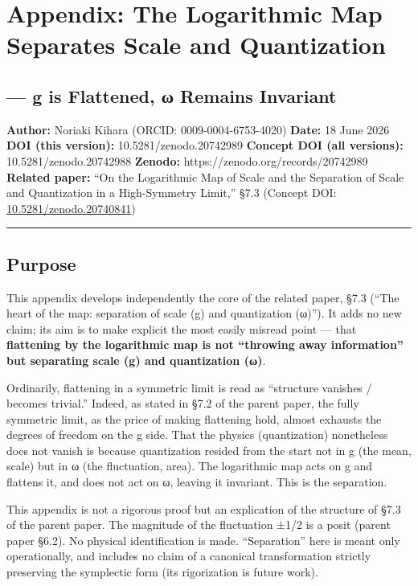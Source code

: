 \documentclass[11pt]{ltjsarticle}
\newcounter{none}
\begin{document}
\section{Appendix: The Logarithmic Map Separates Scale and
Quantization}\label{appendix-the-logarithmic-map-separates-scale-and-quantization}

\subsection{--- g is Flattened, ω Remains
Invariant}\label{g-is-flattened-ux3c9-remains-invariant}

\textbf{Author:} Noriaki Kihara (ORCID: 0009-0004-6753-4020)
\textbf{Date:} 18 June 2026 \textbf{DOI (this version):}
10.5281/zenodo.20742989 \textbf{Concept DOI (all versions):}
10.5281/zenodo.20742988 \textbf{Zenodo:}
https://zenodo.org/records/20742989 \textbf{Related paper:} ``On the
Logarithmic Map of Scale and the Separation of Scale and Quantization in
a High-Symmetry Limit,'' §7.3 (Concept DOI:
\href{https://doi.org/10.5281/zenodo.20740841}{10.5281/zenodo.20740841})

\begin{center}\rule{0.5\linewidth}{0.5pt}\end{center}

\subsection{Purpose}\label{purpose}

This appendix develops independently the core of the related paper, §7.3
(``The heart of the map: separation of scale (g) and quantization
(ω)''). It adds no new claim; its aim is to make explicit the most
easily misread point --- that \textbf{flattening by the logarithmic map
is not ``throwing away information'' but separating scale (g) and
quantization (ω)}.

Ordinarily, flattening in a symmetric limit is read as ``structure
vanishes / becomes trivial.'' Indeed, as stated in §7.2 of the parent
paper, the fully symmetric limit, as the price of making flattening
hold, almost exhausts the degrees of freedom on the g side. That the
physics (quantization) nonetheless does not vanish is because
quantization resided from the start not in g (the mean, scale) but in ω
(the fluctuation, area). The logarithmic map acts on g and flattens it,
and does not act on ω, leaving it invariant. This is the separation.

This appendix is not a rigorous proof but an explication of the
structure of §7.3 of the parent paper. The magnitude of the fluctuation
±1/2 is a posit (parent paper §6.2). No physical identification is made.
``Separation'' here is meant only operationally, and includes no claim
of a canonical transformation strictly preserving the symplectic form
(its rigorization is future work).
\end{document}
